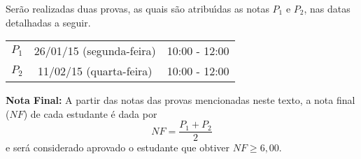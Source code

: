 \documentclass[12pt]{article}
\begin{document}
 Ser\~ao realizadas duas provas, as quais s\~{a}o atribu\'{\i}das as notas $P_1$ e $P_2$, nas datas detalhadas a seguir.

\begin{center}
    \begin{tabular}{c|c|c}
        \hline\hline
        \hspace{1cm}{\bf Prova}\hspace{1cm} & \hspace{3cm}{\bf Data}\hspace{3cm} & \hspace{1.7cm}{\bf Hor\'{a}rio}\hspace{1.7cm} \\
        \hline\hline
        $P_1$ & 26/01/15 (segunda-feira) \phantom{x} & 10:00 - 12:00 \\
        \hline
        $P_2$ & 11/02/15 (quarta-feira) \phantom{x} & 10:00 - 12:00 \\
        \hline\hline
    \end{tabular}
\end{center}

{\bf \noindent Nota Final:} A partir das notas das provas mencionadas neste texto, a nota final ($NF$) de cada estudante \'{e} dada
por
\vspace{-0.15cm}
\[
NF = \frac{ P_1 + P_2}{2}
\]
e ser\'{a} considerado aprovado o estudante que obtiver $NF \geq 6,00$.

\end{document}
